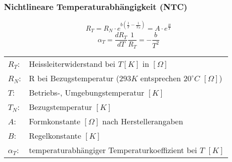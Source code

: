 \subsubsection{Nichtlineare Temperaturabhängigkeit (NTC)}
\[ R_T = R_N \cdot e^{b\left(\frac{1}{T} - \frac{1}{T_N}\right)} 
= A \cdot e^{\frac{B}{T}} \]
\[ \alpha_T = \frac{d R_T}{d T}\frac{1}{R_T} = -\frac{b}{T^2} \]
\begin{tabular}{@{}lp{}}
  $R_T$:        & Heissleiterwiderstand bei $T[K]$ in $[\Omega]$ \\
  $R_N$:        & R bei Bezugstemperatur 
                  ($293 K$ entsprechen $20^\circ C$ $[\Omega]$) \\
  $T$:          & Betriebs-, Umgebungstemperatur $[K]$ \\
  $T_N$:        & Bezugstemperatur $[K]$ \\
  $A$:          & Formkonstante $[\Omega]$ nach Herstellerangaben \\
  $B$:          & Regelkonstante $[K]$ \\
  $\alpha_T$:   & temperaturabhängiger Temperaturkoeffizient bei $T$ $[K]$
\end{tabular}